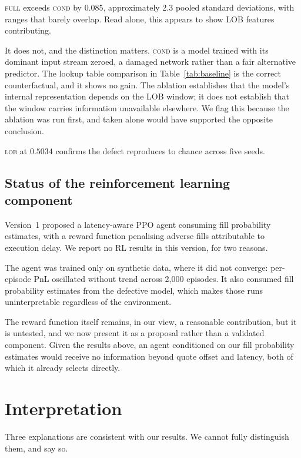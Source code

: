 \documentclass[11pt]{article}
\begin{document}
\noindent
\textsc{full} exceeds \textsc{cond} by 0.085, approximately 2.3 pooled standard
deviations, with ranges that barely overlap. Read alone, this appears to show
LOB features contributing.

It does not, and the distinction matters. \textsc{cond} is a model trained with its dominant input stream zeroed, a
damaged network rather than a fair alternative predictor. The lookup table comparison in Table~\ref{tab:baseline} is the
correct counterfactual, and it shows no gain. The ablation establishes that the
model's internal representation depends on the LOB window; it does not establish
that the window carries information unavailable elsewhere. We flag this because
the ablation was run first, and taken alone would have supported the opposite
conclusion.

\textsc{lob} at $0.5034$ confirms the defect reproduces to chance across five
seeds.

\subsection{Status of the reinforcement learning component}
\label{sec:rl-status}

Version~1 proposed a latency-aware PPO agent consuming fill probability
estimates, with a reward function penalising adverse fills attributable to
execution delay. We report no RL results in this version, for two reasons.

The agent was trained only on synthetic data, where it did not converge:
per-episode PnL oscillated without trend across 2{,}000 episodes. It also consumed fill probability estimates from the defective model, which
makes those runs uninterpretable regardless of the environment.

The reward function itself remains, in our view, a reasonable contribution, but
it is untested, and we now present it as a proposal rather than a validated
component. Given the results above, an agent conditioned on our fill probability
estimates would receive no information beyond quote offset and latency, both of
which it already selects directly.

\section{Interpretation}
\label{sec:interpretation}

Three explanations are consistent with our results. We cannot fully distinguish
them, and say so.
\end{document}
